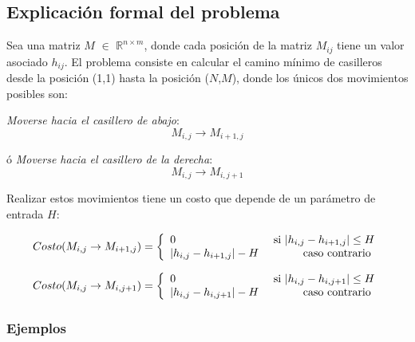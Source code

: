 \subsection{Explicación formal del problema}

Sea una matriz $M$ $\in$ $\mathbb{R}^{n \times m}$, donde cada posición de la matriz $M_{ij}$ tiene un valor asociado $h_{ij}$. El problema consiste en calcular el camino mínimo de casilleros desde la posición (1,1) hasta la posición ($N$,$M$), donde los únicos dos  movimientos posibles son:

\emph{Moverse hacia el casillero de abajo}: \[M_{i,j} \rightarrow M_{i+1,j}\] 

ó \emph{Moverse hacia el casillero de la derecha}: \[M_{i,j} \rightarrow M_{i,j+1}\]

Realizar estos movimientos tiene un costo que depende de un parámetro de entrada $H$:

\begin{equation} \label{costoHaciaAbajo}
   Costo(M_{i,j} \rightarrow M_{i+1,j}) = \left\{ 
     \begin{array}{lr}
       0 							& $ si $  |h_{i,j} - h_{i+1,j}| \leq H \\
       |h_{i,j} - h_{i+1,j}| - H 	&   $ caso contrario $ \\
     \end{array}
   \right.
\end{equation} 

\begin{equation}\label{costoHaciaDerecha}
  Costo(M_{i,j} \rightarrow M_{i,j+1}) = \left\{ 
     \begin{array}{lr}
       0 							& $ si $  |h_{i,j} - h_{i,j+1}| \leq H \\
       |h_{i,j} - h_{i,j+1}| - H 	&   $ caso contrario $ \\
     \end{array}
   \right.
\end{equation} 

\subsubsection{Ejemplos}


